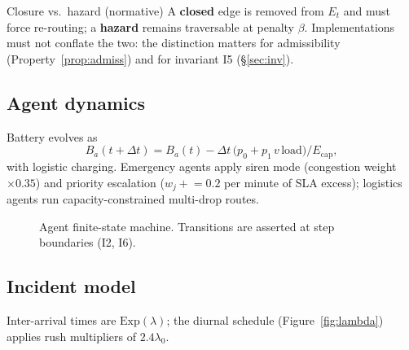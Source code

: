 \documentclass[11pt,a4paper]{article}
\theoremstyle{spaceddef}
\theoremstyle{spacedplain}
\begin{document}
\begin{statement}{Closure vs.\ hazard (normative)}
A \textbf{closed} edge is removed from $E_t$ and must force re-routing; a
\textbf{hazard} remains traversable at penalty $\beta$. Implementations must not
conflate the two: the distinction matters for admissibility
(Property~\ref{prop:admiss}) and for invariant I5 (\S\ref{sec:inv}).
\end{statement}

\subsection{Agent dynamics}
Battery evolves as
\begin{equation}
B_a(t+\Delta t)=B_a(t)-\Delta t\,\bigl(p_0+p_1\,v\,\mathrm{load}\bigr)/E_{\mathrm{cap}},
\end{equation}
with logistic charging. Emergency agents apply siren mode (congestion weight
$\times0.35$) and priority escalation ($w_j\mathrel{+}=0.2$ per minute of SLA
excess); logistics agents run capacity-constrained multi-drop routes.

\begin{figure}[H]\centering
{}
\caption{Agent finite-state machine. Transitions are asserted at step boundaries (I2, I6).}
\label{fig:fsm}
\end{figure}

\subsection{Incident model}
Inter-arrival times are $\mathrm{Exp}(\lambda)$; the diurnal schedule (Figure~\ref{fig:lambda})
applies rush multipliers of $2.4\lambda_0$.
\end{document}
